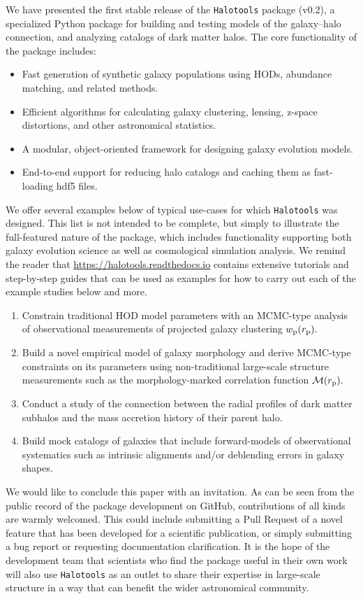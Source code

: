 \documentclass[twocolumn, tighten]{aastex6}
\newcommand{\ben}{\begin{enumerate}}
\newcommand{\een}{\end{enumerate}}
\newcommand{\bit}{\begin{itemize}}
\newcommand{\eit}{\end{itemize}}
\newcommand{\rproj}{r_{\rm p}}
\begin{document}
We have presented the first stable release of the {\tt Halotools} package (v0.2), a specialized Python package for building and testing models of the galaxy--halo connection, and analyzing catalogs of dark matter halos. The core functionality of the package includes:

\bit
\item Fast generation of synthetic galaxy populations using HODs, abundance matching, and related methods.
\item Efficient algorithms for calculating galaxy clustering, lensing, z-space distortions, and other astronomical statistics.
\item A modular, object-oriented framework for designing galaxy evolution models.
\item End-to-end support for reducing halo catalogs and caching them as fast-loading hdf5 files.
\eit

We offer several examples below of typical use-cases for which {\tt Halotools} was designed. This list is not intended to be complete, but simply to illustrate the full-featured nature of the package, which includes functionality supporting both galaxy evolution science as well as cosmological simulation analysis. We remind the reader that \url{https://halotools.readthedocs.io} contains extensive tutorials and step-by-step guides that can be used as examples for how to carry out each of the example studies below and more.

\ben
\item Constrain traditional HOD model parameters with an MCMC-type analysis of observational measurements of projected galaxy clustering $w_{\rm p}(\rproj).$
\item Build a novel empirical model of galaxy morphology and derive MCMC-type constraints on its parameters using non-traditional large-scale structure measurements such as the morphology-marked correlation function $\mathcal{M}(\rproj).$
\item Conduct a study of the connection between the radial profiles of dark matter subhalos and the mass accretion history of their parent halo.
\item Build mock catalogs of galaxies that include forward-models of observational systematics such as intrinsic alignments and/or deblending errors in galaxy shapes.
\een

We would like to conclude this paper with an invitation. As can be seen from the public record of the package development on GitHub, contributions of all kinds are warmly welcomed. This could include submitting a Pull Request of a novel feature that has been developed for a scientific publication, or simply submitting a bug report or requesting documentation clarification. It is the hope of the development team that scientists who find the package useful in their own work will also use {\tt Halotools} as an outlet to share their expertise in large-scale structure in a way that can benefit the wider astronomical community.
\end{document}
